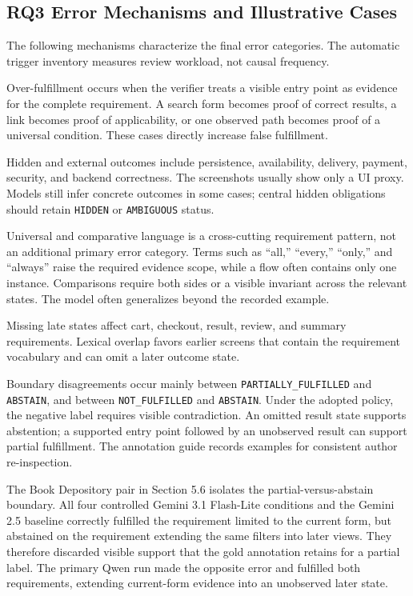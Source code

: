 \subsection{RQ3 Error Mechanisms and Illustrative Cases}\label{rq3-error-mechanisms-and-illustrative-cases}

The following mechanisms characterize the final error categories. The automatic
trigger inventory measures review workload, not causal frequency.

Over-fulfillment occurs when the verifier treats a visible entry point as
evidence for the complete requirement. A search form becomes proof of correct
results, a link becomes proof of applicability, or one observed path becomes
proof of a universal condition. These cases directly increase false
fulfillment.

Hidden and external outcomes include persistence, availability, delivery,
payment, security, and backend correctness. The screenshots usually show only a
UI proxy. Models still infer concrete outcomes in some cases; central hidden
obligations should retain \texttt{HIDDEN} or \texttt{AMBIGUOUS} status.

Universal and comparative language is a cross-cutting requirement pattern, not
an additional primary error category. Terms such as ``all,'' ``every,'' ``only,'' and
``always'' raise the required evidence scope, while a flow often contains only
one instance. Comparisons require both sides or a visible invariant across the
relevant states. The model often generalizes beyond the recorded example.

Missing late states affect cart, checkout, result, review, and summary
requirements. Lexical overlap favors earlier screens that contain the
requirement vocabulary and can omit a later outcome state.

Boundary disagreements occur mainly between \texttt{PARTIALLY\_\allowbreak FULFILLED} and
\texttt{ABSTAIN}, and between \texttt{NOT\_FULFILLED} and \texttt{ABSTAIN}. Under the adopted policy,
the negative label requires visible contradiction. An omitted result state
supports abstention; a supported entry point followed by an unobserved result
can support partial fulfillment. The annotation guide records examples for
consistent author re-inspection.

The Book Depository pair in Section 5.6 isolates the partial-versus-abstain
boundary. All four controlled Gemini 3.1 Flash-Lite conditions and the Gemini
2.5 baseline correctly fulfilled the requirement limited to the current form,
but abstained on the requirement extending the same filters into later views.
They therefore discarded visible support that the gold annotation retains for
a partial label. The primary Qwen run made the opposite error and fulfilled
both requirements, extending current-form evidence into an unobserved later
state.

